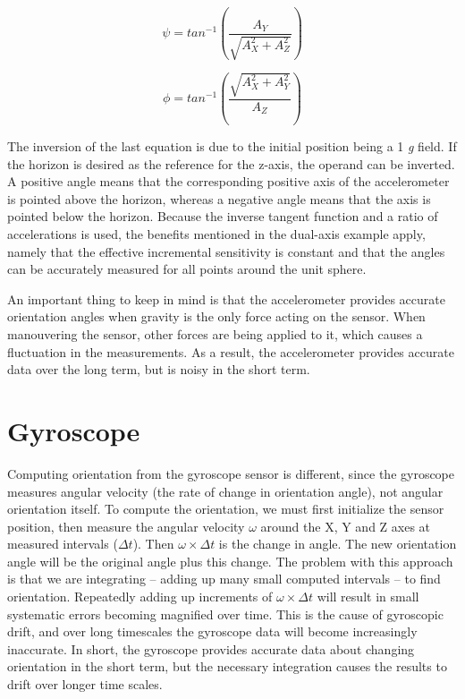  \begin{equation}	
 	\psi=tan^{-1}\left(\frac{A_{Y}}{\sqrt{A_{X}^{2}+A_{Z}^{2}}}\right)
 \end{equation}
 
 \begin{equation}	
 	\phi=tan^{-1}\left(\frac{\sqrt{A_{X}^{2}+A_{Y}^{2}}}{A_{Z}}\right)
 \end{equation}
 
The inversion of the last equation is due to the initial position being a 1 \textit{g} field. If the horizon is desired as the reference for the z-axis, the operand can be inverted. A positive angle means that the corresponding positive axis of the accelerometer is pointed above the horizon, whereas a negative angle means that the axis is pointed below the horizon. Because the inverse tangent function and a ratio of accelerations is used, the benefits mentioned in the dual-axis example apply, namely that the effective incremental sensitivity is constant and that the angles can be accurately measured for all points around the unit sphere.

An important thing to keep in mind is that the accelerometer provides accurate orientation angles when gravity is the only force acting on the sensor. When manouvering the sensor, other forces are being applied to it, which causes a fluctuation in the measurements. As a result, the accelerometer provides accurate data over the long term, but is noisy in the short term\cite{AccelCite2}.

\section{Gyroscope}
Computing orientation from the gyroscope sensor is different, since the gyroscope measures angular velocity (the rate of change in orientation angle), not angular orientation itself. To compute the orientation, we must first initialize the sensor position, then measure the angular velocity $\omega$ around the X, Y and Z axes at measured intervals ($\Delta t$).   Then $\omega \times \Delta t$ is the change in angle. The new orientation angle will be the original angle plus this change. The problem with this approach is that we are integrating – adding up many small computed intervals – to find orientation.  Repeatedly adding up increments of  $\omega \times \Delta t$ will result in small systematic errors becoming magnified over time. This is the cause of gyroscopic drift, and over long timescales the gyroscope data will become increasingly inaccurate. In short, the gyroscope provides accurate data about changing orientation in the short term, but the necessary integration causes the results to drift over longer time scales.

